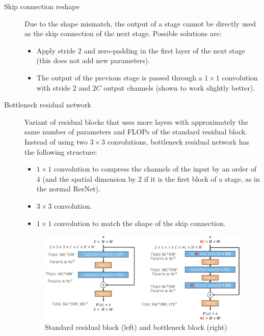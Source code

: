 \begin{description}
    \item[Skip connection reshape]
        Due to the shape mismatch, the output of a stage cannot be directly used as the skip connection of the next stage.
        Possible solutions are:
        \begin{itemize}
            \item Apply stride $2$ and zero-padding in the first layer of the next stage (this does not add new parameters).
            \item The output of the previous stage is passed through a $1 \times 1$ convolution with stride $2$ and $2C$ output channels (shown to work slightly better).
        \end{itemize}

    \item[Bottleneck residual network] 
        Variant of residual blocks that uses more layers with approximately the same number of parameters and FLOPs of the standard residual block.
        Instead of using two $3 \times 3$ convolutions, bottleneck residual network has the following structure:
        \begin{itemize}
            \item $1 \times 1$ convolution to compress the channels of the input by an order of $4$ (and the spatial dimension by $2$ if it is the first block of a stage, as in the normal ResNet).
            \item $3 \times 3$ convolution.
            \item $1 \times 1$ convolution to match the shape of the skip connection.
        \end{itemize}

        \begin{figure}[H]
            \centering
            \includegraphics[width=0.7\linewidth]{./img/bottleneck_block.png}
            \caption{Standard residual block (left) and bottleneck block (right)}
        \end{figure}
\end{description}

